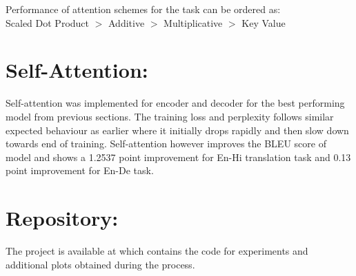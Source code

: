 \documentclass[11pt,a4paper]{article}
\begin{document}

Performance of attention schemes for the task can be ordered as: \\
Scaled Dot Product $>$ Additive $>$  Multiplicative $>$ Key Value 

\section{Self-Attention:}
Self-attention was implemented for encoder and decoder for the best performing model from previous sections. The training loss and perplexity follows similar expected behaviour as earlier where it initially drops rapidly and then slow down towards end of training. Self-attention however improves the BLEU score of model and shows a 1.2537 point improvement for En-Hi translation task and 0.13 point improvement for En-De task.

\section*{Repository:}
The project is available at \cite{GitHub} which contains the code for experiments and additional plots obtained during the process.



\end{document}
